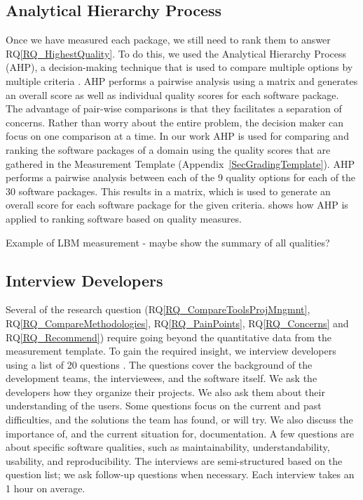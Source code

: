 \documentclass[runningheads]{llncs}
\newcommand{\rqref}[1]{RQ\ref{#1}}
\begin{document}
\subsection{Analytical Hierarchy Process} \label{AHP}

Once we have measured each package, we still need to rank them to answer
\rqref{RQ_HighestQuality}.  To do this, we used the Analytical Hierarchy Process
(AHP), a decision-making technique that is used to compare multiple options by
multiple criteria \cite{Saaty}. AHP performs a pairwise analysis using a matrix
and generates an overall score as well as individual quality scores for each
software package. The advantage of pair-wise comparisons is that they
facilitates a separation of concerns.  Rather than worry about the entire
problem, the decision maker can focus on one comparison at a time.  In our work
AHP is used for comparing and ranking the software packages of a domain using
the quality scores that are gathered in the Measurement Template
(Appendix~\ref{SecGradingTemplate}). AHP performs a pairwise analysis between
each of the 9 quality options for each of the 30 software packages.  This
results in a matrix, which is used to generate an overall score for each
software package for the given criteria. \cite{SmithEtAl2016} shows how AHP is
applied to ranking software based on quality measures.

Example of LBM measurement - maybe show the summary of all qualities?

\subsection{Interview Developers} \label{SecSurvey}

Several of the research question (\rqref{RQ_CompareToolsProjMngmnt},
\rqref{RQ_CompareMethodologies}, \rqref{RQ_PainPoints}, \rqref{RQ_Concerns} and
\rqref{RQ_Recommend}) require going beyond the quantitative data from the
measurement template. To gain the required insight, we interview developers
using a list of 20 questions \cite{SmithEtAl2021}. The questions cover the
background of the development teams, the interviewees, and the software itself.
We ask the developers how they organize their projects. We also ask them about
their understanding of the users. Some questions focus on the current and past
difficulties, and the solutions the team has found, or will try. We also discuss
the importance of, and the current situation for, documentation. A few questions
are about specific software qualities, such as maintainability,
understandability, usability, and reproducibility. The interviews are
semi-structured based on the question list; we ask follow-up questions when
necessary.  Each interview takes an 1 hour on average.
\end{document}
